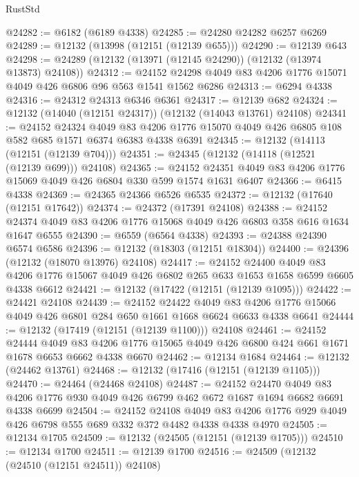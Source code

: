 \begin{lexlean}{RustStd}
\begin{coremodule}
{\begin{coremodule}
{{{{{{{{{{{{{{{{{{{{{{{{{{{{{{{{{{{{{{{{{{{{{{{{{{@24282 := @6182 (@6189 @4338)
@24285 := @24280 @24282 @6257 @6269
@24289 := @12132 (@13998 (@12151 (@12139 @655)))
@24290 := @12139 @643
@24298 := @24289 (@12132 (@13971 (@12145 @24290)) (@12132 (@13974 @13873) @24108))
@24312 := @24152 @24298 @4049 @83 @4206 @1776 @15071 @4049 @426 @6806 @96 @563 @1541 @1562 @6286
@24313 := @6294 @4338
@24316 := @24312 @24313 @6346 @6361
@24317 := @12139 @682
@24324 := @12132 (@14040 (@12151 @24317)) (@12132 (@14043 @13761) @24108)
@24341 := @24152
    @24324
    @4049
    @83
    @4206
    @1776
    @15070
    @4049
    @426
    @6805
    @108
    @582
    @685
    @1571
    @6374
    @6383
    @4338
    @6391
@24345 := @12132 (@14113 (@12151 (@12139 @704)))
@24351 := @24345 (@12132 (@14118 (@12521 (@12139 @699))) @24108)
@24365 := @24152 @24351 @4049 @83 @4206 @1776 @15069 @4049 @426 @6804 @330 @599 @1574 @1631 @6407
@24366 := @6415 @4338
@24369 := @24365 @24366 @6526 @6535
@24372 := @12132 (@17640 (@12151 @17642))
@24374 := @24372 (@17391 @24108)
@24388 := @24152 @24374 @4049 @83 @4206 @1776 @15068 @4049 @426 @6803 @358 @616 @1634 @1647 @6555
@24390 := @6559 (@6564 @4338)
@24393 := @24388 @24390 @6574 @6586
@24396 := @12132 (@18303 (@12151 @18304))
@24400 := @24396 (@12132 (@18070 @13976) @24108)
@24417 := @24152
    @24400
    @4049
    @83
    @4206
    @1776
    @15067
    @4049
    @426
    @6802
    @265
    @633
    @1653
    @1658
    @6599
    @6605
    @4338
    @6612
@24421 := @12132 (@17422 (@12151 (@12139 @1095)))
@24422 := @24421 @24108
@24439 := @24152
    @24422
    @4049
    @83
    @4206
    @1776
    @15066
    @4049
    @426
    @6801
    @284
    @650
    @1661
    @1668
    @6624
    @6633
    @4338
    @6641
@24444 := @12132 (@17419 (@12151 (@12139 @1100))) @24108
@24461 := @24152
    @24444
    @4049
    @83
    @4206
    @1776
    @15065
    @4049
    @426
    @6800
    @424
    @661
    @1671
    @1678
    @6653
    @6662
    @4338
    @6670
@24462 := @12134 @1684
@24464 := @12132 (@24462 @13761)
@24468 := @12132 (@17416 (@12151 (@12139 @1105)))
@24470 := @24464 (@24468 @24108)
@24487 := @24152
    @24470
    @4049
    @83
    @4206
    @1776
    @930
    @4049
    @426
    @6799
    @462
    @672
    @1687
    @1694
    @6682
    @6691
    @4338
    @6699
@24504 := @24152
    @24108
    @4049
    @83
    @4206
    @1776
    @929
    @4049
    @426
    @6798
    @555
    @689
    @332
    @372
    @4482
    @4338
    @4338
    @4970
@24505 := @12134 @1705
@24509 := @12132 (@24505 (@12151 (@12139 @1705)))
@24510 := @12134 @1700
@24511 := @12139 @1700
@24516 := @24509 (@12132 (@24510 (@12151 @24511)) @24108)
}}}}}}}}}}}}}}}}}}}}}}}}}}}}}}}}}}}}}}}}}}}}}}}}}}
\end{coremodule}}
\end{coremodule}
\end{lexlean}
